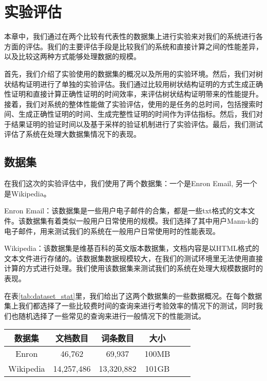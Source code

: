 \chapter{实验评估}
\label{chap:evaluation}
本章中，我们通过在两个比较有代表性的数据集上进行实验来对我们的系统进行各方面的评估。我们的主要评估手段是比较我们的系统和直接计算之间的性能差异，以及比较这两种方式能够处理数据的规模。

首先，我们介绍了实验使用的数据集的概况以及所用的实验环境。然后，我们对树状结构证明进行了单独的实验评估。我们通过比较用树状结构证明的方式生成正确性证明和直接计算正确性证明的时间效率，来评估树状结构证明带来的性能提升。接着，我们对系统的整体性能做了实验评估，使用的是任务的总时间，包括搜索时间、生成正确性证明的时间、生成完整性证明的时间作为评估指标。然后，我们对于结果证明的验证时间以及基于采样的验证机制进行了实验评估。最后，我们测试评估了系统在处理大数据集情况下的表现。

\section{数据集}

在我们这次的实验评估中，我们使用了两个数据集：一个是Enron Email, 另一个是Wikipedia。

Enron Email：该数据集是一些用户电子邮件的合集，都是一些txt格式的文本文件。该数据集有着类似一般用户日常使用的规模。我们选择了其中用户Mann-k的电子邮件，用来测试我们的系统在一般用户日常使用时的性能表现。

Wikipedia：该数据集是维基百科的英文版本数据集，文档内容是以HTML格式的文本文件进行存储的。该数据集数据规模较大，在我们的测试环境里无法使用直接计算的方式进行处理。我们使用该数据集来测试我们的系统在处理大规模数据时的表现。

在表\ref{tab:dataset_stat}里，我们给出了这两个数据集的一些数据概况。在每个数据集上我们都选择了一些比较费时间的查询来进行考验效率的情况下的测试，同时我们也随机选择了一些常见的查询来进行一般情况下的性能测试。
\begin{table}[htb]
    \centering
    \begin{tabular}{cccccc}
        \toprule
        数据集 & 文档数目 & 词条数目 & 大小 \\
        \midrule
        Enron & 46,762 & 69,937 & 100MB  \\
        Wikipedia & 14,257,486 & 13,320,882 & 101GB  \\
        \bottomrule
    \end{tabular}
\end{table}

